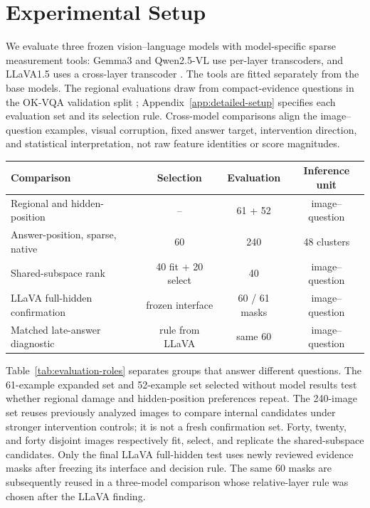 \section{Experimental Setup}
\label{sec:experimental-setup}

We evaluate three frozen vision--language models with model-specific sparse measurement tools: Gemma3 and Qwen2.5-VL use per-layer transcoders, and LLaVA1.5 uses a cross-layer transcoder \citep{gemma3,qwen25vl,llava,dunefsky2024transcoders,ameisen2025circuittracing}. The tools are fitted separately from the base models. The regional evaluations draw from compact-evidence questions in the OK-VQA validation split \citep{okvqa}; Appendix~\ref{app:detailed-setup} specifies each evaluation set and its selection rule. Cross-model comparisons align the image--question examples, visual corruption, fixed answer target, intervention direction, and statistical interpretation, not raw feature identities or score magnitudes.

\begin{center}
\begin{minipage}{\linewidth}
\captionsetup{type=table,hypcap=false}
\caption{\textbf{Evaluation roles and independent units.} Dash: no interface selection; 61+52: separate evaluations; 60/61: accepted/reviewed masks.}
\label{tab:evaluation-roles}
\centering
\small
\begin{tabular*}{\linewidth}{@{\extracolsep{\fill}}lccc@{}}
\toprule
Comparison & Selection & Evaluation & Inference unit \\
\midrule
Regional and hidden-position & -- & 61 + 52 & image--question \\
Answer-position, sparse, native & 60 & 240 & 48 clusters \\
Shared-subspace rank & 40 fit + 20 select & 40 & image--question \\
LLaVA full-hidden confirmation & frozen interface & 60 / 61 masks & image--question \\
Matched late-answer diagnostic & rule from LLaVA & same 60 & image--question \\
\bottomrule
\end{tabular*}
\end{minipage}
\end{center}

Table~\ref{tab:evaluation-roles} separates groups that answer different questions. The 61-example expanded set and 52-example set selected without model results test whether regional damage and hidden-position preferences repeat. The 240-image set reuses previously analyzed images to compare internal candidates under stronger intervention controls; it is not a fresh confirmation set. Forty, twenty, and forty disjoint images respectively fit, select, and replicate the shared-subspace candidates. Only the final LLaVA full-hidden test uses newly reviewed evidence masks after freezing its interface and decision rule. The same 60 masks are subsequently reused in a three-model comparison whose relative-layer rule was chosen after the LLaVA finding.

